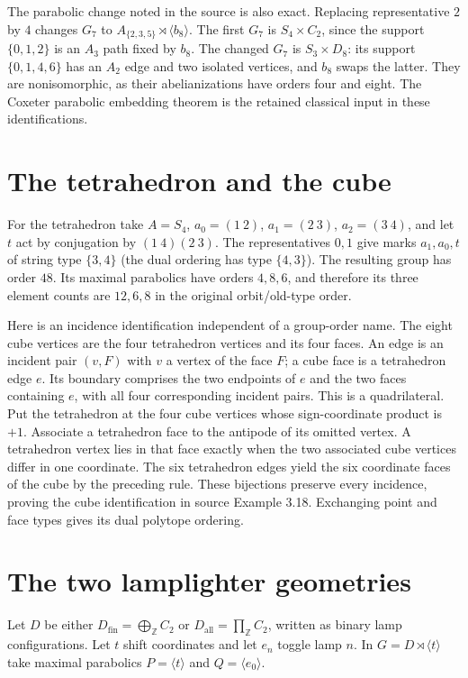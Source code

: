 The parabolic change noted in the source is also exact. Replacing
representative $2$ by $4$ changes $G_7$ to
$A_{\{2,3,5\}}\rtimes\langle b_8\rangle$. The first $G_7$ is
$S_4\times C_2$, since the support $\{0,1,2\}$ is an $A_3$ path
fixed by $b_8$. The changed $G_7$ is $S_3\times D_8$: its support
$\{0,1,4,6\}$ has an $A_2$ edge and two isolated vertices, and
$b_8$ swaps the latter. They are nonisomorphic, as their abelianizations
have orders four and eight. The Coxeter parabolic embedding theorem is
the retained classical input in these identifications.

\section{The tetrahedron and the cube}
For the tetrahedron take $A=S_4$, $a_0=(1\ 2)$, $a_1=(2\ 3)$,
$a_2=(3\ 4)$, and let $t$ act by conjugation by $(1\ 4)(2\ 3)$.
The representatives $0,1$ give marks $a_1,a_0,t$ of string type
$\{3,4\}$ (the dual ordering has type $\{4,3\}$). The resulting
group has order $48$. Its maximal parabolics have orders $4,8,6$,
and therefore its three element counts are $12,6,8$ in the original
orbit/old-type order.

Here is an incidence identification independent of a group-order name.
The eight cube vertices are the four tetrahedron vertices and its four
faces. An edge is an incident pair $(v,F)$ with $v$ a vertex of the
face $F$; a cube face is a tetrahedron edge $e$. Its boundary comprises
the two endpoints of $e$ and the two faces containing $e$, with all
four corresponding incident pairs. This is a quadrilateral. Put the
tetrahedron at the four cube vertices whose sign-coordinate product is
$+1$. Associate a tetrahedron face to the antipode of its omitted
vertex. A tetrahedron vertex lies in that face exactly when the two
associated cube vertices differ in one coordinate. The six tetrahedron
edges yield the six coordinate faces of the cube by the preceding rule.
These bijections preserve every incidence, proving the cube identification
in source Example 3.18. Exchanging point and face types gives its dual
polytope ordering.

\section{The two lamplighter geometries}
Let $D$ be either $D_{\mathrm{fin}}=\bigoplus_{\mathbb Z}C_2$ or
$D_{\mathrm{all}}=\prod_{\mathbb Z}C_2$, written as binary lamp
configurations. Let $t$ shift coordinates and let $e_n$ toggle lamp $n$.
In $G=D\rtimes\langle t\rangle$ take maximal parabolics
$P=\langle t\rangle$ and $Q=\langle e_0\rangle$.

